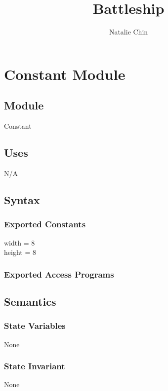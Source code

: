 \documentclass[12pt,fleqn]{article}
\title{Battleship}
\author{Natalie Chin}
\begin{document}
\maketitle

\newpage

\section* {Constant Module}

    \subsection*{Module}

    Constant

    \subsection* {Uses}

    N/A

    \subsection* {Syntax}

    \subsubsection* {Exported Constants}

    width = 8 \\
    height = 8

    \subsubsection* {Exported Access Programs}

    \subsection* {Semantics}

    \subsubsection* {State Variables}
    None

    \subsubsection* {State Invariant}
    None
\end{document}
